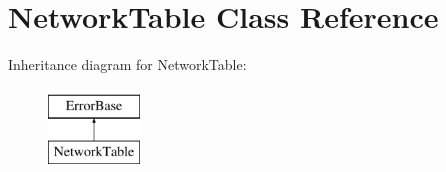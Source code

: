 \hypertarget{classNetworkTable}{
\section{NetworkTable Class Reference}
\label{classNetworkTable}
}
Inheritance diagram for NetworkTable:\begin{figure}[H]
\begin{center}
\leavevmode
\includegraphics[height=2.000000cm]{classNetworkTable}
\end{center}
\end{figure}
